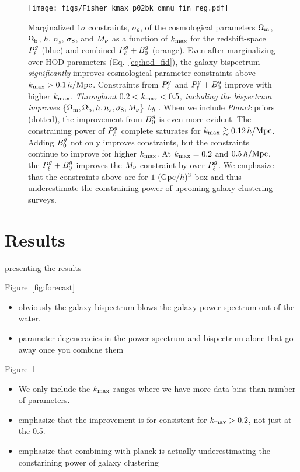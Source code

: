 \begin{figure}
    \begin{center}
        \texttt{[image: figs/Fisher\_kmax\_p02bk\_dmnu\_fin\_reg.pdf]}
        \caption{Marginalized $1\sigma$ constraints, $\sigma_\theta$, of the
        cosmological parameters $\Omega_{\rm m}$, $\Omega_{\rm b}$, $h$, $n_s$, $\sigma_8$, and $M_\nu$
        as a function of $k_{\rm max}$ for the redshift-space $P^g_{\ell}$ (blue)
        and combined $P^g_{\ell} + B^g_0$ (orange). Even after marginalizing over
        HOD parameters (Eq.~\ref{eq:hod_fid}), the galaxy bispectrum {\em
        significantly} improves cosmological parameter constraints above
        $k_{\rm max} > 0.1\,h/\mathrm{Mpc}$. Constraints from $P^g_{\ell}$ and
        $P^g_{\ell} + B^g_0$ improve with higher $k_{\rm max}$. {\em Throughout 
        $0.2 < k_{\rm max} < 0.5$, including the bispectrum improves 
        $\{\Omega_{\rm m}, \Omega_{\rm b}, h, n_s, \sigma_8, M_\nu\}$ by .} When we include 
        {\em Planck} priors (dotted), the improvement from $B^g_0$ is even more
        evident. The constraining power of $P^g_{\ell}$ complete
        saturates for $k_{\rm max} \gtrsim 0.12\,h/\mathrm{Mpc}$. Adding $B^g_0$ not only 
        improves constraints, but the constraints continue to improve for
        higher $k_{\rm max}$. At $k_{\rm max} = 0.2$ and $0.5\,h/\mathrm{Mpc}$, the $P^g_{\ell}
        + B^g_0$ improves the $M_\nu$ constraint by  over $P^g_{\ell}$. 
        We emphasize that the constraints above are for $1~({\rm Gpc}/h)^3$ box
        and thus underestimate the constraining power of upcoming galaxy
        clustering surveys.
        }
        \label{fig:kmax_forecast}
    \end{center}
\end{figure}

\section{Results} \label{sec:results} 
presenting the results 

Figure~\ref{fig:forecast}
\begin{itemize}
    \item obviously the galaxy bispectrum blows the galaxy power spectrum out
        of the water.  
    \item parameter degeneracies in the power spectrum and bispectrum alone
        that go away once you combine them
\end{itemize}


Figure~\ref{fig:kmax_forecast}
\begin{itemize}
    \item We only include the $k_{\rm max}$ ranges where we have more data bins than number of parameters. 
    \item emphasize that the improvement is for consistent for $k_{\rm max} >
        0.2$, not just at the 0.5. 
    \item emphasize that combining with planck is actually underestimating the
        constarining power of galaxy clustering
\end{itemize}


